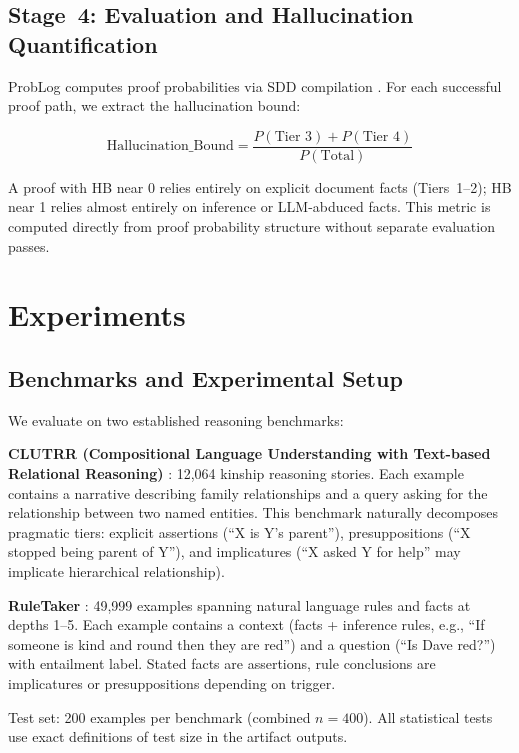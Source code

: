 \documentclass[11pt,letterpaper]{article}
\begin{document}
\subsection{Stage~4: Evaluation and Hallucination Quantification}

ProbLog computes proof probabilities via SDD compilation \citep{DeRaedt2007}. For each successful proof path, we extract the hallucination bound:

\begin{equation}
\text{Hallucination\_Bound} = \frac{P(\text{Tier~3}) + P(\text{Tier~4})}{P(\text{Total})}
\end{equation}

A proof with HB near 0 relies entirely on explicit document facts (Tiers~1--2); HB near 1 relies almost entirely on inference or LLM-abduced facts. This metric is computed directly from proof probability structure without separate evaluation passes.

\section{Experiments}
\label{sec:experiments}

\subsection{Benchmarks and Experimental Setup}

We evaluate on two established reasoning benchmarks:

\textbf{CLUTRR (Compositional Language Understanding with Text-based Relational Reasoning)} \citep{Sinha2019}: 12,064 kinship reasoning stories. Each example contains a narrative describing family relationships and a query asking for the relationship between two named entities. This benchmark naturally decomposes pragmatic tiers: explicit assertions (``X is Y's parent''), presuppositions (``X stopped being parent of Y''), and implicatures (``X asked Y for help'' may implicate hierarchical relationship).

\textbf{RuleTaker} \citep{Tafjord2021}: 49,999 examples spanning natural language rules and facts at depths 1--5. Each example contains a context (facts + inference rules, e.g., ``If someone is kind and round then they are red'') and a question (``Is Dave red?'') with entailment label. Stated facts are assertions, rule conclusions are implicatures or presuppositions depending on trigger.

Test set: 200 examples per benchmark (combined $n=400$). All statistical tests use exact definitions of test size in the artifact outputs.
\end{document}
